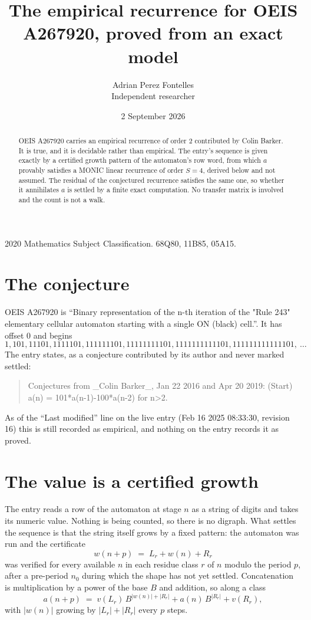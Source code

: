 \documentclass[11pt,a4paper]{article}
\title{The empirical recurrence for OEIS A267920, proved from an exact model}
\author{Adrian Perez Fontelles\\ \small Independent researcher}
\date{2 September 2026}
\theoremstyle{plain}
\theoremstyle{definition}
\begin{document}
\maketitle

\begin{abstract}
OEIS A267920 carries an empirical recurrence of order $2$ contributed by Colin Barker. It is true, and it is
decidable rather than empirical. The entry's sequence is given exactly by a certified growth pattern of the automaton's row word, from
which $a$ provably satisfies a MONIC linear recurrence of order $S=4$, derived below and not
assumed. The residual of the conjectured recurrence satisfies the same one, so whether it
annihilates $a$ is settled by a finite exact computation. No transfer matrix is involved and
the count is not a walk.
\end{abstract}

\noindent\small 2020 Mathematics Subject Classification. 68Q80, 11B85, 05A15.\normalsize

\section{The conjecture}

OEIS A267920 is ``Binary representation of the n-th iteration of the "Rule 243" elementary cellular automaton starting with a single ON (black) cell.''. It has offset $0$ and begins
\[
1, 101, 11101, 1111101, 111111101, 11111111101, 1111111111101, 111111111111101,\ \dots
\]
The entry states, as a conjecture contributed by its author and never marked settled:
\begin{quote}
Conjectures from \_Colin Barker\_, Jan 22 2016 and Apr 20 2019: (Start) a(n) = 101*a(n-1)-100*a(n-2) for n>2.
\end{quote}
As of the ``Last modified'' line on the live entry (Feb 16 2025 08:33:30, revision 16)
this is still recorded as empirical, and nothing on the entry records it as proved.

\section{The value is a certified growth}

The entry reads a row of the automaton at stage $n$ as a string of digits and takes its
numeric value. Nothing is being counted, so there is no digraph. What settles the sequence is
that the string itself grows by a fixed pattern: the automaton was run and the certificate
\[
w(n+p)\;=\;L_r + w(n) + R_r
\]
was verified for every available $n$ in each residue class $r$ of $n$ modulo the period $p$,
after a pre-period $n_0$ during which the shape has not yet settled. Concatenation is
multiplication by a power of the base $B$ and addition, so along a class
\[
a(n+p)\;=\;v(L_r)\,B^{|w(n)|+|R_r|} + a(n)\,B^{|R_r|} + v(R_r),
\]
with $|w(n)|$ growing by $|L_r|+|R_r|$ every $p$ steps.
\end{document}
